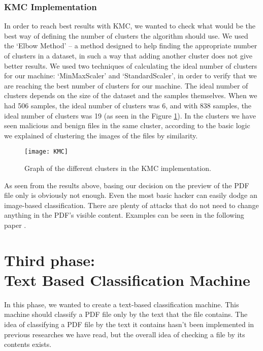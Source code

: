 \documentclass{article}
\begin{document}
\subsubsection{KMC Implementation}
\indent In order to reach best results with KMC, we wanted to check what would be the best way of defining the number of clusters the algorithm should use. We used the ‘Elbow Method’ – a method designed to help finding the appropriate number of clusters in a dataset, in such a way that adding another cluster does not give better results. We used two techniques of calculating the ideal number of clusters for our machine: ‘MinMaxScaler’ and ‘StandardScaler’, in order to verify that we are reaching the best number of clusters for our machine. The ideal number of clusters depends on the size of the dataset and the samples themselves. When we had 506 samples, the ideal number of clusters was 6, and with 838 samples, the ideal number of clusters was 19 (as seen in the Figure \ref{fig:KMC}). In the clusters we have seen malicious and benign files in the same cluster, according to the basic logic we explained of clustering the images of the files by similarity.

\begin{figure}[h]
    \centering
    \texttt{[image: KMC]}
    \caption{Graph of the different clusters in the KMC implementation.}
    \label{fig:KMC}
\end{figure}

\indent As seen from the results above, basing our decision on the preview of the PDF file only is obviously not enough. Even the most basic hacker can easily dodge an image-based classification. There are plenty of attacks that do not need to change anything in the PDF’s visible content. Examples can be seen in the following paper \cite{davide2019malicious}.

\section[Third phase: Text Based Classification Machine]{Third phase: \\ Text Based Classification Machine}
\indent In this phase, we wanted to create a text-based classification machine. This machine should classify a PDF file only by the text that the file contains. The idea of classifying a PDF file by the text it contains hasn't been implemented in previous researches we have read, but the overall idea of checking a file by its contents exists.
\end{document}
